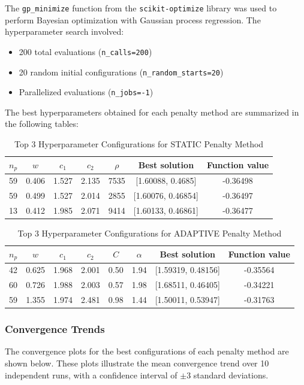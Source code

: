 \documentclass[12pt]{article}
\begin{document}
The \texttt{gp\_minimize} function from the \texttt{scikit-optimize} library was used to perform Bayesian optimization with Gaussian process regression. The hyperparameter search involved:
\begin{itemize}
    \item 200 total evaluations (\texttt{n\_calls=200})
    \item 20 random initial configurations (\texttt{n\_random\_starts=20})
    \item Parallelized evaluations (\texttt{n\_jobs=-1})
\end{itemize}

The best hyperparameters obtained for each penalty method are summarized in the following tables:

\begin{table}[h!]
\centering
\caption{Top 3 Hyperparameter Configurations for STATIC Penalty Method}
\begin{tabular}{|c|c|c|c|c|c|c|}
\hline
$n_p$ & $w$ & $c_1$ & $c_2$ & $\rho$ & Best solution & Function value \\
\hline
59 & 0.406 & 1.527 & 2.135 & 7535 & [1.60088, 0.4685] & -0.36498 \\
59 & 0.499 & 1.527 & 2.014 & 2855 & [1.60076, 0.46854] & -0.36497 \\
13 & 0.412 & 1.985 & 2.071 & 9414 & [1.60133, 0.46861] & -0.36477 \\
\hline
\end{tabular}
\end{table}

\begin{table}[h!]
\centering
\caption{Top 3 Hyperparameter Configurations for ADAPTIVE Penalty Method}
\begin{tabular}{|c|c|c|c|c|c|c|c|}
\hline
$n_p$ & $w$ & $c_1$ & $c_2$ & $C$ & $\alpha$ & Best solution & Function value \\
\hline
42 & 0.625 & 1.968 & 2.001 & 0.50 & 1.94 & [1.59319, 0.48156] & -0.35564 \\
60 & 0.726 & 1.988 & 2.003 & 0.57 & 1.98 & [1.68511, 0.46405] & -0.34221 \\
59 & 1.355 & 1.974 & 2.481 & 0.98 & 1.44 & [1.50011, 0.53947] & -0.31763 \\
\hline
\end{tabular}
\end{table}

\subsubsection*{Convergence Trends}
The convergence plots for the best configurations of each penalty method are shown below. These plots illustrate the mean convergence trend over 10 independent runs, with a confidence interval of $\pm$3 standard deviations.
\end{document}

